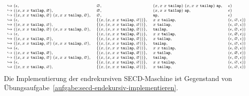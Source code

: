 \begin{displaymath}\scriptsize
  \begin{array}{l@{}llll}
 \hookrightarrow{}&(\epsilon, &\varnothing, &(x, x~x~\mathtt{tailap})~(x, x~x~\mathtt{tailap})~\mathtt{ap}, &\epsilon)\\
\hookrightarrow{}&((x, x~x~\mathtt{tailap}, \varnothing), &\varnothing, &(x, x~x~\mathtt{tailap})~\mathtt{ap}, &\epsilon)\\
\hookrightarrow{}&((x, x~x~\mathtt{tailap}, \varnothing)~(x, x~x~\mathtt{tailap}, \varnothing), &\varnothing, &\mathtt{ap}, &\epsilon)\\
\hookrightarrow{}&(\epsilon, &\{(x, (x, x~x~\mathtt{tailap}, \varnothing))\}, &x~x~\mathtt{tailap}, &(\epsilon, \varnothing, \epsilon))\\
\hookrightarrow{}&((x, x~x~\mathtt{tailap}, \varnothing), &\{(x, (x, x~x~\mathtt{tailap}, \varnothing))\}, &x~\mathtt{tailap}, &(\epsilon, \varnothing, \epsilon))\\
\hookrightarrow{}&((x, x~x~\mathtt{tailap}, \varnothing)~(x, x~x~\mathtt{tailap}, \varnothing), &\{(x, (x, x~x~\mathtt{tailap}, \varnothing))\}, &\mathtt{tailap}, &(\epsilon, \varnothing, \epsilon))\\
\hookrightarrow{}&(\epsilon, &\{(x, (x, x~x~\mathtt{tailap}, \varnothing))\}, &x~x~\mathtt{tailap}, &(\epsilon, \varnothing, \epsilon))\\
\hookrightarrow{}&((x, x~x~\mathtt{tailap}, \varnothing), &\{(x, (x, x~x~\mathtt{tailap}, \varnothing))\}, &x~\mathtt{tailap}, &(\epsilon, \varnothing, \epsilon))\\
\hookrightarrow{}&((x, x~x~\mathtt{tailap}, \varnothing)~(x, x~x~\mathtt{tailap}, \varnothing), &\{(x, (x, x~x~\mathtt{tailap}, \varnothing))\}, &\mathtt{tailap}, &(\epsilon, \varnothing, \epsilon))\\
\hookrightarrow{}&(\epsilon, &\{(x, (x, x~x~\mathtt{tailap}, \varnothing))\}, &x~x~\mathtt{tailap}, &(\epsilon, \varnothing, \epsilon))\\
\hookrightarrow{}&((x, x~x~\mathtt{tailap}, \varnothing), &\{(x, (x, x~x~\mathtt{tailap}, \varnothing))\}, &x~\mathtt{tailap}, &(\epsilon, \varnothing, \epsilon))\\
\hookrightarrow{}&((x, x~x~\mathtt{tailap}, \varnothing)~(x, x~x~\mathtt{tailap}, \varnothing), &\{(x, (x, x~x~\mathtt{tailap}, \varnothing))\}, &\mathtt{tailap}, &(\epsilon, \varnothing, \epsilon))\\
\hookrightarrow{}&(\epsilon, &\{(x, (x, x~x~\mathtt{tailap}, \varnothing))\}, &x~x~\mathtt{tailap}, &(\epsilon, \varnothing, \epsilon))\\
\hookrightarrow{}&((x, x~x~\mathtt{tailap}, \varnothing), &\{(x, (x, x~x~\mathtt{tailap}, \varnothing))\}, &x~\mathtt{tailap}, &(\epsilon, \varnothing, \epsilon))
 \end{array}
\end{displaymath}
Die Implementierung der endrekursiven SECD-Maschine ist Gegenstand von
Übungsaufgabe~\ref{aufgabe:secd-endekursiv-implementieren}.


